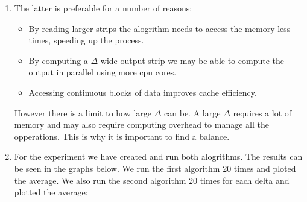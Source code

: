 \documentclass{article}
\begin{document}
\noindent 
\begin{enumerate} [label = \Alph*]
  \item The latter is preferable for a number of reasons:
  \begin{itemize}
    \item By reading larger strips the alogrithm needs to access the memory less times, speeding up the process.
    \item By computing a $\Delta$-wide output strip we may be able to compute the output in parallel using more cpu cores.
    \item Accessing continuous blocks of data improves cache efficiency.
  \end{itemize}
  However there is a limit to how large $\Delta$ can be. A large $\Delta$ requires a lot of memory and may also require computing overhead to manage all the opperations.
  This is why it is important to find a balance.

  \item For the experiment we have created and run both alogrithms. The results can be seen in the graphs below.
  We run the first algorithm 20 times and ploted the average. We also run the second algorithm 20 times for each delta and plotted the average:


\end{enumerate}
\end{document}
